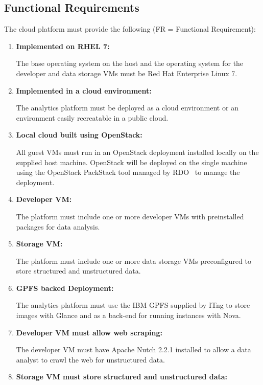 \subsection{Functional Requirements}
\label{sec:func-reqs}

The cloud platform must provide the following (FR = Functional Requirement):
\begin{enumerate}[label=\textbf{FR-\arabic*}]
\item \textbf{Implemented on RHEL 7:} 

  The base operating system on the host and the operating system
  for the developer and data storage VMs must be Red Hat Enterprise
  Linux 7.
  
\item \textbf{Implemented in a cloud environment:}

  The analytics platform must be deployed as a cloud environment or
  an environment easily recreatable in a public cloud.

\item \textbf{Local cloud built using OpenStack:} 

  All guest VMs must run in an OpenStack deployment installed 
  locally on the supplied host machine. OpenStack will be deployed on
  the single machine using the OpenStack PackStack tool managed by
  RDO~\cite{rdo} to manage the deployment.


\item \textbf{Developer VM:}
  
  The platform must include one or more developer VMs with
  preinstalled packages for data analysis.

\item \textbf{Storage VM:}
  
  The platform must include one or more data storage VMs
  preconfigured to store structured and unstructured data.


\item \textbf{GPFS backed Deployment:}

  The analytics platform must use the IBM GPFS supplied by ITng to
  store images with Glance and as a back-end for running instances
  with Nova. 

\item \textbf{Developer VM must allow web scraping:} 

  The developer VM must have Apache Nutch 2.2.1 installed to 
  allow a data analyst to crawl the web for unstructured data.

\item \textbf{Storage VM must store structured and unstructured data:}
  

\end{enumerate}
